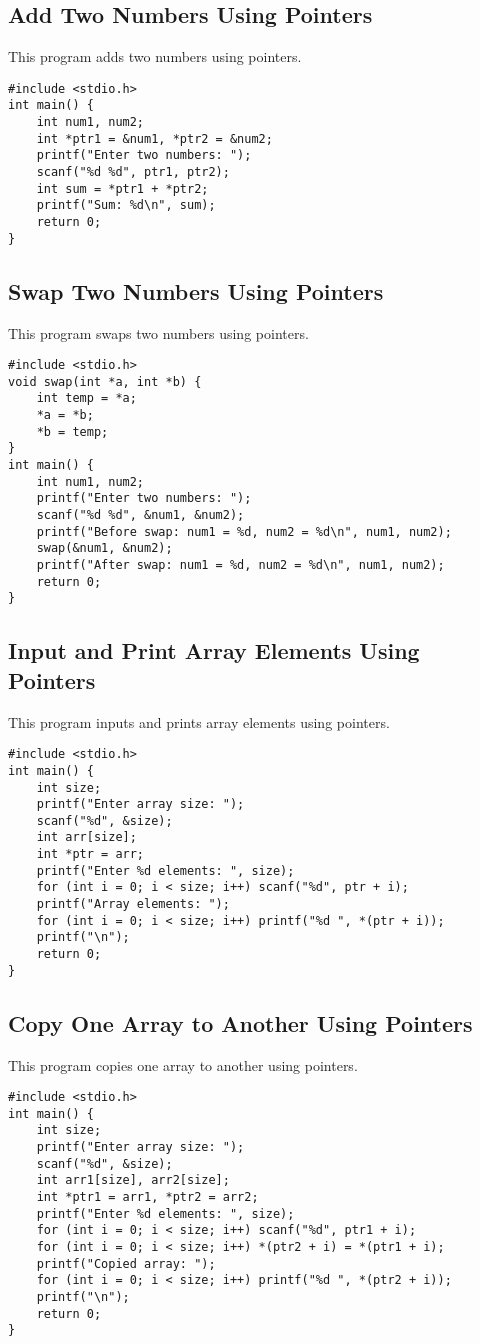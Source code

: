 \documentclass[a4paper,12pt]{article}
\begin{document}
\subsection{Add Two Numbers Using Pointers}
This program adds two numbers using pointers.
\begin{lstlisting}[caption={Add Two Numbers Using Pointers}]
#include <stdio.h>
int main() {
    int num1, num2;
    int *ptr1 = &num1, *ptr2 = &num2;
    printf("Enter two numbers: ");
    scanf("%d %d", ptr1, ptr2);
    int sum = *ptr1 + *ptr2;
    printf("Sum: %d\n", sum);
    return 0;
}
\end{lstlisting}
\clearpage

\subsection{Swap Two Numbers Using Pointers}
This program swaps two numbers using pointers.
\begin{lstlisting}[caption={Swap Two Numbers Using Pointers}]
#include <stdio.h>
void swap(int *a, int *b) {
    int temp = *a;
    *a = *b;
    *b = temp;
}
int main() {
    int num1, num2;
    printf("Enter two numbers: ");
    scanf("%d %d", &num1, &num2);
    printf("Before swap: num1 = %d, num2 = %d\n", num1, num2);
    swap(&num1, &num2);
    printf("After swap: num1 = %d, num2 = %d\n", num1, num2);
    return 0;
}
\end{lstlisting}
\clearpage

\subsection{Input and Print Array Elements Using Pointers}
This program inputs and prints array elements using pointers.
\begin{lstlisting}[caption={Input and Print Array Elements Using Pointers}]
#include <stdio.h>
int main() {
    int size;
    printf("Enter array size: ");
    scanf("%d", &size);
    int arr[size];
    int *ptr = arr;
    printf("Enter %d elements: ", size);
    for (int i = 0; i < size; i++) scanf("%d", ptr + i);
    printf("Array elements: ");
    for (int i = 0; i < size; i++) printf("%d ", *(ptr + i));
    printf("\n");
    return 0;
}
\end{lstlisting}
\clearpage

\subsection{Copy One Array to Another Using Pointers}
This program copies one array to another using pointers.
\begin{lstlisting}[caption={Copy One Array to Another Using Pointers}]
#include <stdio.h>
int main() {
    int size;
    printf("Enter array size: ");
    scanf("%d", &size);
    int arr1[size], arr2[size];
    int *ptr1 = arr1, *ptr2 = arr2;
    printf("Enter %d elements: ", size);
    for (int i = 0; i < size; i++) scanf("%d", ptr1 + i);
    for (int i = 0; i < size; i++) *(ptr2 + i) = *(ptr1 + i);
    printf("Copied array: ");
    for (int i = 0; i < size; i++) printf("%d ", *(ptr2 + i));
    printf("\n");
    return 0;
}
\end{lstlisting}
\clearpage
\end{document}
